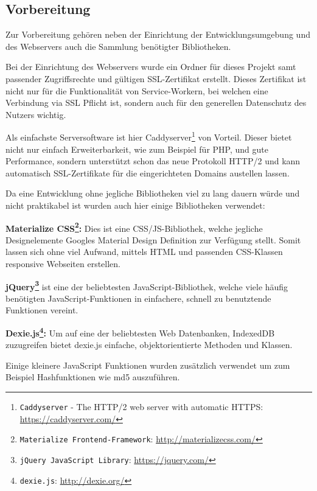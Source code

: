 \documentclass[a4paper,12pt,ngerman,listof=numbered]{scrartcl}      %
\let\oldcite\cite
\renewcommand{\cite}[1]{\textsuperscript{\oldcite{#1}}}
\newcommand{\spacer}{\par\bigskip\noindent}
\providecommand{\inlinecode}[1]{\texttt{#1}}
\begin{document}
	\subsection{Vorbereitung}
	Zur Vorbereitung gehören neben der Einrichtung der Entwicklungsumgebung und des Webservers auch die Sammlung benötigter Bibliotheken.\par
	Bei der Einrichtung des Webservers wurde ein Ordner für dieses Projekt samt passender Zugriffsrechte und gültigen SSL-Zertifikat erstellt. Dieses Zertifikat ist nicht nur für die Funktionalität von Service-Workern, bei welchen eine Verbindung via SSL Pflicht ist, sondern auch für den generellen Datenschutz des Nutzers wichtig.\par
	Als einfachste Serversoftware ist hier Caddyserver\footnote{\inlinecode{Caddyserver} - The HTTP/2 web server with automatic HTTPS: \url{https://caddyserver.com/}} von Vorteil. Dieser bietet nicht nur einfach Erweiterbarkeit, wie zum Beispiel für PHP, und gute Performance, sondern unterstützt schon das neue Protokoll HTTP/2 und kann automatisch SSL-Zertifikate für die eingerichteten Domains austellen lassen.\par
	\noindent Da eine Entwicklung ohne jegliche Bibliotheken viel zu lang dauern würde und nicht praktikabel ist wurden auch hier einige Bibliotheken verwendet:\par
	\spacer\textbf{Materialize CSS\footnote{\inlinecode{Materialize Frontend-Framework}: \url{http://materializecss.com/}}:} Dies ist eine CSS/JS-Bibliothek, welche jegliche Designelemente Googles Material Design Definition zur Verfügung stellt. Somit lassen sich ohne viel Aufwand, mittels HTML und passenden CSS-Klassen responsive Webseiten erstellen.\par
	\spacer\textbf{jQuery\footnote{\inlinecode{jQuery JavaScript Library}: \url{https://jquery.com/}}} ist eine der beliebtesten JavaScript-Bibliothek\cite{jQueryCoverage}, welche viele häufig be\-nö\-ti\-gten JavaScript-Funktionen in einfachere, schnell zu benutztende Funktionen vereint.\par
	\spacer\textbf{Dexie.js\footnote{\inlinecode{dexie.js}: \url{http://dexie.org/}}:} Um auf eine der beliebtesten Web Datenbanken, IndexedDB zuzugreifen bietet dexie.js einfache, objektorientierte Methoden und Klassen.\par
	\spacer Einige kleinere JavaScript Funktionen wurden zusätzlich verwendet um zum Beispiel Hashfunktionen wie md5 auszuführen.\par
	
\end{document}
